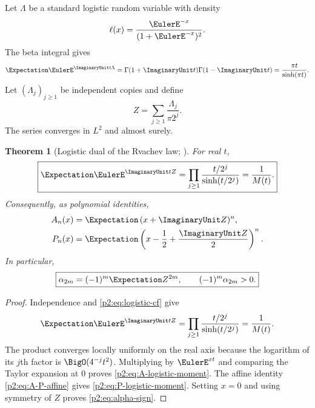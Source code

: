 \documentclass[11pt,oneside]{article}
\numberwithin{equation}{section}
\newtheorem{theorem}{Theorem}[section]
\theoremstyle{definition}
\theoremstyle{remark}
\begin{document}
Let $\Lambda$ be a standard logistic random variable with density
\begin{equation}
 \ell(x)=\frac{\EulerE^{-x}}{(1+\EulerE^{-x})^2}.
 \label{p2:eq:logistic-density}
\end{equation}
The beta integral gives
\begin{equation}
 \Expectation\EulerE^{\ImaginaryUnit t\Lambda}
 =\Gamma(1+\ImaginaryUnit t)\Gamma(1-\ImaginaryUnit t)
 =\frac{\pi t}{\sinh(\pi t)}.
 \label{p2:eq:logistic-cf}
\end{equation}
Let $(\Lambda_j)_{j\ge1}$ be independent copies and define
\begin{equation}
 Z=\sum_{j\ge1}\frac{\Lambda_j}{\pi2^j}.
 \label{p2:eq:Z-logistic}
\end{equation}
The series converges in $L^2$ and almost surely.

\begin{theorem}[Logistic dual of the Rvachev law; \statusnew]
\label{p2:thm:logistic-dual}
For real $t$,
\begin{equation}
 \boxed{
 \Expectation\EulerE^{\ImaginaryUnit tZ}
 =\prod_{j\ge1}\frac{t/2^j}{\sinh(t/2^j)}
 =\frac1{M(t)}.
 }
 \label{p2:eq:Z-cf}
\end{equation}
Consequently, as polynomial identities,
\begin{align}
 A_n(x)&=\Expectation\,(x+\ImaginaryUnit Z)^n,
 \label{p2:eq:A-logistic-moment}\\
 P_n(x)&=\Expectation\left(x-\frac12+\frac{\ImaginaryUnit Z}{2}\right)^n.
 \label{p2:eq:P-logistic-moment}
\end{align}
In particular,
\begin{equation}
 \boxed{
 \alpha_{2m}=(-1)^m\Expectation Z^{2m},
 \qquad (-1)^m\alpha_{2m}>0.
 }
 \label{p2:eq:alpha-sign}
\end{equation}
\end{theorem}

\begin{proof}
Independence and \eqref{p2:eq:logistic-cf} give
\[
 \Expectation\EulerE^{\ImaginaryUnit tZ}
 =\prod_{j\ge1}
 \frac{t/2^j}{\sinh(t/2^j)}=\frac1{M(t)}.
\]
The product converges locally uniformly on the real axis because the logarithm of its $j$th factor
is $\BigO(4^{-j}t^2)$.  Multiplying by $\EulerE^{xt}$ and comparing the Taylor expansion at $0$ proves
\eqref{p2:eq:A-logistic-moment}.  The affine identity \eqref{p2:eq:A-P-affine} gives
\eqref{p2:eq:P-logistic-moment}.  Setting $x=0$ and using symmetry of $Z$ proves
\eqref{p2:eq:alpha-sign}.
\end{proof}
\end{document}
